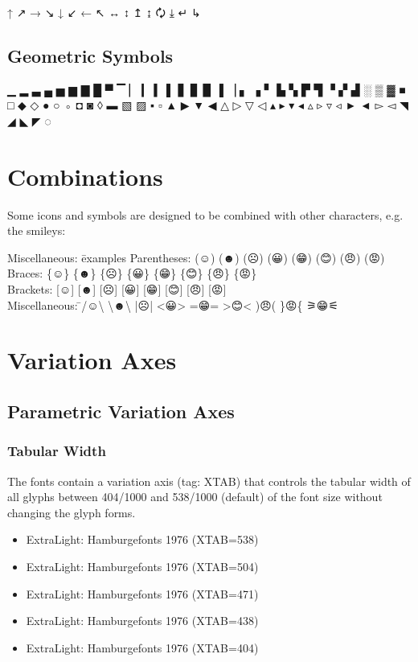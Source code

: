↑ ↗ → ↘ ↓ ↙ ← ↖ ↔ ↕ ↥ ↨ 🗘 ⤓ ↵ ↳

\subsection{Geometric Symbols}

▁ ▂ ▃ ▄ ▅ ▆ ▇ █ ▀ ▔ ▏ ▎ ▍ ▌ ▋ ▊ ▉ ▐ ▕ ▖ ▗ ▘ ▙ ▚ ▛ ▜ ▝ ▞ ▟ ░ ▒ ▓ ■ □ ◆ ◇ ● ○ ◦ ◘ ◙ ◊ ▬ ▧ ▨ ▪ ▫ ▲ ▶ ▼ ◀ △ ▷ ▽ ◁ ▴ ▸ ▾ ◂ ▵ ▹ ▿ ◃ ► ◄ ▻ ◅ ◥ ◢ ◣ ◤ ◌

\section{Combinations}

Some icons and symbols are designed to be combined with other characters, e.g. the smileys:

\begin{tabbing}
	Miscellaneous: \= examples \kill
	Parentheses: \> \large (☺) (☻) (☹) (😀) (😁) (😊) (😠) (😡) \\
	Braces:      \> \large \{☺\} \{☻\} \{☹\} \{😀\} \{😁\} \{😊\} \{😠\} \{😡\} \\
	Brackets:    \> \large [☺] [☻] [☹] [😀] [😁] [😊] [😠] [😡] \\
	Miscellaneous: \= \large /☺\textbackslash{} \textbackslash ☻\textbackslash{} |☹| <😀> =😁=  >😊< )😠( \}😡\{ ⚞😁⚟ \\
\end{tabbing}

\section{Variation Axes}

\subsection{Parametric Variation Axes}

\subsubsection{Tabular Width}

The fonts contain a variation axis (tag: XTAB) that controls the tabular width of all glyphs between {404/1000} and {538/1000} (default) of the font size without changing the glyph forms.


\def\xtab{Hamburgefonts 1976}
\begin{itemize}
	\item { ExtraLight: \xtab{} (XTAB=538)}
	\item { ExtraLight: \xtab{} (XTAB=504)}
	\item { ExtraLight: \xtab{} (XTAB=471)}
	\item { ExtraLight: \xtab{} (XTAB=438)}
	\item { ExtraLight: \xtab{} (XTAB=404)}
\end{itemize}

